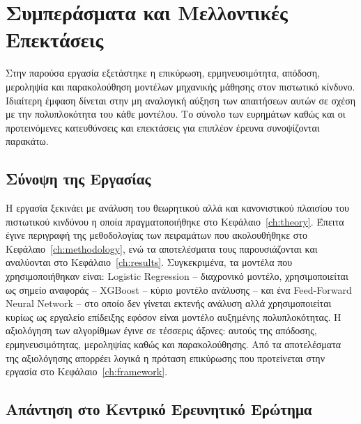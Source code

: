 \chapter{Συμπεράσματα και Μελλοντικές Επεκτάσεις}
\label{ch:conclusions}

Στην παρούσα εργασία εξετάστηκε η επικύρωση, ερμηνευσιμότητα, απόδοση, μεροληψία
και παρακολούθηση μοντέλων μηχανικής μάθησης στον πιστωτικό κίνδυνο.
Ιδιαίτερη έμφαση δίνεται στην μη αναλογική αύξηση των απαιτήσεων αυτών σε σχέση
με την πολυπλοκότητα του κάθε μοντέλου. Το σύνολο των ευρημάτων καθώς και οι
προτεινόμενες κατευθύνσεις και επεκτάσεις για επιπλέον έρευνα συνοψίζονται παρακάτω.

\section{Σύνοψη της Εργασίας}
\label{sec:summary}

Η εργασία ξεκινάει με ανάλυση του θεωρητικού αλλά και κανονιστικού πλαισίου
του πιστωτικού κινδύνου η οποία πραγματοποιήθηκε στο Κεφάλαιο~\ref{ch:theory}.
Έπειτα έγινε περιγραφή της μεθοδολογίας των πειραμάτων που ακολουθήθηκε στο
Κεφάλαιο~\ref{ch:methodology}, ενώ τα αποτελέσματα τους παρουσιάζονται και
αναλύονται στο Κεφάλαιο~\ref{ch:results}. Συγκεκριμένα, τα μοντέλα που
χρησιμοποιήθηκαν είναι: Logistic Regression -- διαχρονικό μοντέλο,
χρησιμοποιείται ως σημείο αναφοράς -- XGBoost -- κύριο μοντέλο ανάλυσης --
και ένα Feed-Forward Neural Network -- στο οποίο δεν γίνεται εκτενής ανάλυση
αλλά χρησιμοποιείται κυρίως ως εργαλείο επίδειξης εφόσον είναι μοντέλο
αυξημένης πολυπλοκότητας. Η αξιολόγηση των αλγορίθμων έγινε σε τέσσερις
άξονες: αυτούς της απόδοσης, ερμηνευσιμότητας, μεροληψίας καθώς και
παρακολούθησης. Από τα αποτελέσματα της αξιολόγησης απορρέει λογικά η
πρόταση επικύρωσης που προτείνεται στην εργασία στο Κεφάλαιο~\ref{ch:framework}.

\section{Απάντηση στο Κεντρικό Ερευνητικό Ερώτημα}
\label{sec:research_question}


